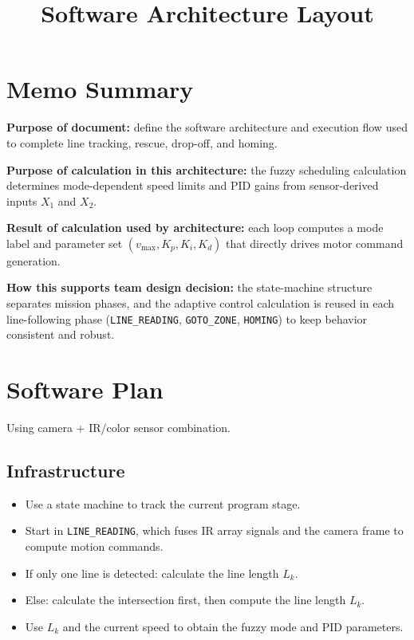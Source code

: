 \documentclass{article}
\begin{document}
\title{Software Architecture Layout}
\author{}
\date{}
\maketitle

\section{Memo Summary}
\noindent\textbf{Purpose of document:} define the software architecture and execution flow used to complete line tracking, rescue, drop-off, and homing.
\vspace{\baselineskip}

\noindent\textbf{Purpose of calculation in this architecture:} the fuzzy scheduling calculation determines mode-dependent speed limits and PID gains from sensor-derived inputs $X_1$ and $X_2$.
\vspace{\baselineskip}

\noindent\textbf{Result of calculation used by architecture:} each loop computes a mode label and parameter set $(v_{\max}, K_p, K_i, K_d)$ that directly drives motor command generation.
\vspace{\baselineskip}

\noindent\textbf{How this supports team design decision:} the state-machine structure separates mission phases, and the adaptive control calculation is reused in each line-following phase (\texttt{LINE\_READING}, \texttt{GOTO\_ZONE}, \texttt{HOMING}) to keep behavior consistent and robust.

\section{Software Plan}
Using camera + IR/color sensor combination.

\subsection*{Infrastructure}
\begin{itemize}
\item Use a state machine to track the current program stage.
\item Start in \texttt{LINE\_READING}, which fuses IR array signals and the camera frame to compute motion commands.
\item If only one line is detected: calculate the line length $L_k$.
\item Else: calculate the intersection first, then compute the line length $L_k$.
\item Use $L_k$ and the current speed to obtain the fuzzy mode and PID parameters.
\end{itemize}
\end{document}
